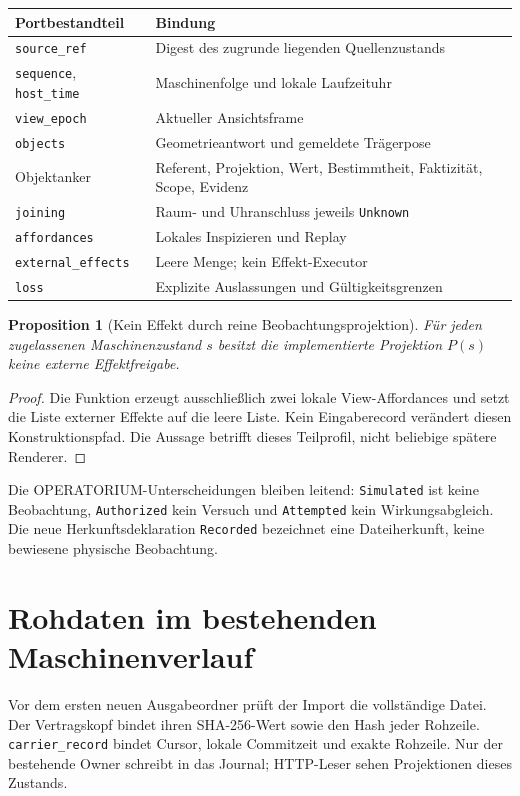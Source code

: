 \documentclass[11pt,a4paper]{article}
\newcommand{\nextsection}[2]{\clearpage{\color{accent}\small\textsf{#1}}\section{#2}}
\newtheorem{proposition}{Proposition}[section]
\begin{document}
\begin{tabularx}{\linewidth}{@{}lY@{}}\toprule
Portbestandteil & Bindung\\\midrule
\texttt{source\_ref} & Digest des zugrunde liegenden Quellenzustands\\
\texttt{sequence}, \texttt{host\_time} & Maschinenfolge und lokale Laufzeituhr\\
\texttt{view\_epoch} & Aktueller Ansichtsframe\\
\texttt{objects} & Geometrieantwort und gemeldete Trägerpose\\
Objektanker & Referent, Projektion, Wert, Bestimmtheit, Faktizität, Scope, Evidenz\\
\texttt{joining} & Raum- und Uhranschluss jeweils \texttt{Unknown}\\
\texttt{affordances} & Lokales Inspizieren und Replay\\
\texttt{external\_effects} & Leere Menge; kein Effekt-Executor\\
\texttt{loss} & Explizite Auslassungen und Gültigkeitsgrenzen\\\bottomrule
\end{tabularx}

\begin{proposition}[Kein Effekt durch reine Beobachtungsprojektion]
Für jeden zugelassenen Maschinenzustand $s$ besitzt die implementierte
Projektion $P(s)$ keine externe Effektfreigabe.
\end{proposition}
\begin{proof}
Die Funktion erzeugt ausschließlich zwei lokale View-Affordances
und setzt die Liste externer Effekte auf die leere Liste. Kein
Eingaberecord verändert diesen Konstruktionspfad. Die Aussage
betrifft dieses Teilprofil, nicht beliebige spätere Renderer.
\end{proof}

Die OPERATORIUM-Unterscheidungen bleiben leitend:
\texttt{Simulated} ist keine Beobachtung, \texttt{Authorized}
kein Versuch und \texttt{Attempted} kein Wirkungsabgleich.
Die neue Herkunftsdeklaration \texttt{Recorded} bezeichnet eine
Dateiherkunft, keine bewiesene physische Beobachtung.

\nextsection{87 / OWNER UND REPLAY}{Rohdaten im bestehenden Maschinenverlauf}
Vor dem ersten neuen Ausgabeordner prüft der Import die vollständige
Datei. Der Vertragskopf bindet ihren SHA-256-Wert sowie den Hash
jeder Rohzeile. \texttt{carrier\_record} bindet Cursor, lokale
Commitzeit und exakte Rohzeile. Nur der bestehende Owner schreibt
in das Journal; HTTP-Leser sehen Projektionen dieses Zustands.
\end{document}
